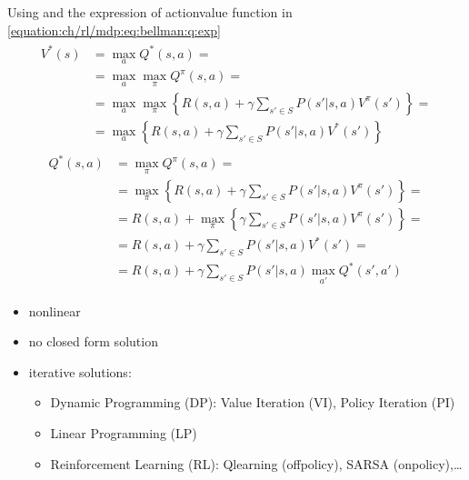 \documentclass[letterpaper,10pt,english]{jupyterBook}
\begin{document}
\sphinxAtStartPar
{}
Using {\hyperref[\detokenize{ch/rl/mdp:prop:optimal-v-q}]{}} and the expression of action\sphinxhyphen{}value function in \eqref{equation:ch/rl/mdp:eq:bellman:q:exp}
\begin{equation*}
\begin{split}\begin{aligned}
  V^{*}(s) 
  & = \max_a Q^*(s,a) = \\
  & = \max_a \max_{\pi} Q^{\pi}(s,a) = \\
  & = \max_a \max_{\pi} \left\{ R(s,a) + \gamma \sum_{s' \in S} P(s'|s,a) V^{\pi}(s') \right\} = \\
  & = \max_a \left\{ R(s,a) + \gamma \sum_{s' \in S} P(s'|s,a) V^{*}(s') \right\} 
\end{aligned}\end{split}
\end{equation*}\begin{equation*}
\begin{split}\begin{aligned}
  Q^{*}(s,a) 
  & = \max_\pi Q^{\pi}(s,a) = \\
  & = \max_\pi \left\{ R(s,a) + \gamma \sum_{s' \in S} P(s'|s,a) V^{\pi}(s') \right\} = \\
  & = R(s,a) + \max_\pi \left\{ \gamma \sum_{s' \in S} P(s'|s,a) V^{\pi}(s') \right\} = \\
  & = R(s,a) + \gamma \sum_{s' \in S} P(s'|s,a) V^{*}(s') = \\ 
  & = R(s,a) + \gamma \sum_{s' \in S} P(s'|s,a) \max_{a'} Q^*(s', a') 
\end{aligned}\end{split}
\end{equation*}
\sphinxAtStartPar
{}

\sphinxAtStartPar
{}

\sphinxAtStartPar
{}
\begin{itemize}
\item {} 
\sphinxAtStartPar
non\sphinxhyphen{}linear

\item {} 
\sphinxAtStartPar
no closed form solution

\item {} 
\sphinxAtStartPar
iterative solutions:
\begin{itemize}
\item {} 
\sphinxAtStartPar
Dynamic Programming (DP): Value Iteration (VI), Policy Iteration (PI)

\item {} 
\sphinxAtStartPar
Linear Programming (LP)

\item {} 
\sphinxAtStartPar
Reinforcement Learning (RL): Q\sphinxhyphen{}learning (off\sphinxhyphen{}policy), SARSA (on\sphinxhyphen{}policy),…

\end{itemize}

\end{itemize}
\end{document}
